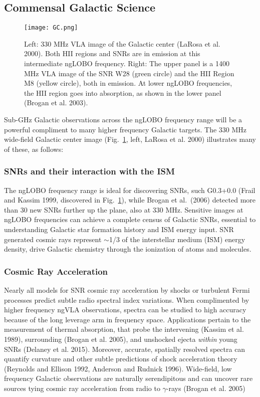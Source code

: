 \documentclass[11pt]{article}
\begin{document}
\subsection{Commensal Galactic Science}


\begin{figure}[ht!]
\begin{center}
\texttt{[image: GC.png]}
\end{center}
\vspace{-0.5cm}
  \caption{Left: 330 MHz VLA image of the Galactic center (LaRosa et al. 2000). Both HII regions and SNRs are in emission at this intermediate ngLOBO frequency. Right: The upper panel is a 1400 MHz VLA image of the SNR W28 (green circle) and the HII Region M8 (yellow circle), both in emission. At lower ngLOBO frequencies, the HII region goes into absorption, as shown in the lower panel (Brogan et al. 2003).
}
\label{GC}
\end{figure}

Sub-GHz Galactic observations across the ngLOBO frequency range will be a powerful compliment to many higher frequency Galactic targets. The 330 MHz wide-field Galactic center image (Fig.~\ref{GC}, left, LaRosa et al. 2000) illustrates many of these, as follows:

\subsubsection{SNRs and their interaction with the ISM}

The ngLOBO frequency range is ideal for discovering SNRs, such G0.3+0.0 (Frail and Kassim 1999, discovered in Fig.~\ref{GC}), while Brogan et al.\ (2006) detected more than 30 new SNRs further up the plane, also at 330 MHz. Sensitive images at ngLOBO frequencies can achieve a complete census of Galactic SNRs, essential to understanding Galactic star formation history and ISM energy input. SNR generated cosmic rays represent $\sim$1/3 of the interstellar medium (ISM) energy density, drive Galactic chemistry through the ionization of atoms and molecules. 

\subsubsection{Cosmic Ray Acceleration}

Nearly all models for SNR cosmic ray acceleration by shocks or turbulent Fermi processes predict subtle radio spectral index variations. When complimented by higher frequency ngVLA observations, spectra can be studied to high accuracy because of the long leverage arm in frequency space. Applications pertain to the measurement of thermal absorption, that probe the intervening (Kassim et al. 1989), surrounding (Brogan et al. 2005), and unshocked ejecta {\it within} young SNRs (Delaney et al. 2015). Moreover, accurate, spatially resolved spectra can quantify curvature and other subtle predictions of shock acceleration theory (Reynolds and Ellison 1992, Anderson and Rudnick 1996). Wide-field, low frequency Galactic observations are naturally serendipitous and can uncover rare sources tying cosmic ray acceleration from radio to $\gamma$-rays (Brogan et al. 2005)
\end{document}
